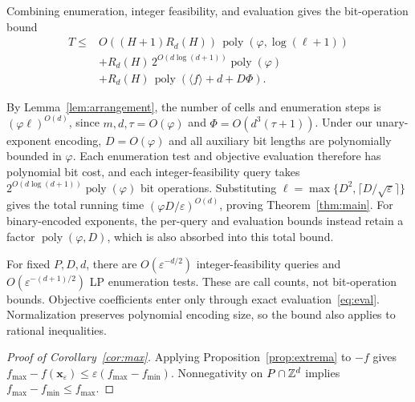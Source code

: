 \documentclass[final,5p,times,twocolumn]{elsarticle}
\theoremstyle{definition}\newtheorem{definition}{Definition}[section]
\theoremstyle{remark}\newtheorem{remark}[theorem]{Remark}
\newcommand{\eps}{\varepsilon}
\newcommand{\poly}{\operatorname{poly}}
\begin{document}
Combining enumeration, integer feasibility, and evaluation gives the bit-operation bound
\[
\begin{aligned}
 T\le{}&O((H+1)R_d(H))\,
          \poly(\varphi,\log(\ell+1))\\
       &+R_d(H)\,2^{O(d\log(d+1))}\poly(\varphi)\\
       &+R_d(H)\,\poly(\langle f\rangle+d+D\Phi).
\end{aligned}
\]

By Lemma~\ref{lem:arrangement}, the number of cells and enumeration steps is $(\varphi\ell)^{O(d)}$, since $m,d,\tau=O(\varphi)$ and $\Phi=O(d^3(\tau+1))$. Under our unary-exponent encoding, $D=O(\varphi)$ and all auxiliary bit lengths are polynomially bounded in $\varphi$. Each enumeration test and objective evaluation therefore has polynomial bit cost, and each integer-feasibility query takes $2^{O(d\log(d+1))}\poly(\varphi)$ bit operations. Substituting $\ell=\max\{D^2,\lceil D/\sqrt\eps\rceil\}$ gives the total running time $(\varphi D/\eps)^{O(d)}$, proving Theorem~\ref{thm:main}. For binary-encoded exponents, the per-query and evaluation bounds instead retain a factor $\poly(\varphi,D)$, which is also absorbed into this total bound.

For fixed $P,D,d$, there are $O(\eps^{-d/2})$ integer-feasibility queries and $O(\eps^{-(d+1)/2})$ LP enumeration tests. These are call counts, not bit-operation bounds. Objective coefficients enter only through exact evaluation~\eqref{eq:eval}. Normalization preserves polynomial encoding size, so the bound also applies to rational inequalities.

\begin{proof}[Proof of Corollary~\ref{cor:max}]
Applying Proposition~\ref{prop:extrema} to $-f$ gives $f_{\max}-f(\mathbf{x}_{\eps})\le\eps (f_{\max}-f_{\min})$. Nonnegativity on $P\cap\mathbb Z^d$ implies $f_{\max}-f_{\min}\le f_{\max}$.
\end{proof}
\end{document}
